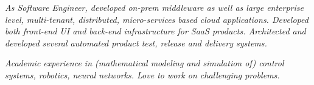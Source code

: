 
{\selectfont
\begin{justify}\textit{As Software Engineer, developed on-prem middleware as well as large enterprise level, multi-tenant, distributed, micro-services based cloud applications. Developed both front-end UI and back-end infrastructure for SaaS products. Architected and developed several automated product test, release and delivery systems.}\end{justify}
}

{\selectfont
\begin{justify}\textit{Academic experience in (mathematical modeling and simulation of) control systems, robotics, neural networks. Love to work on challenging problems.}\end{justify}
}